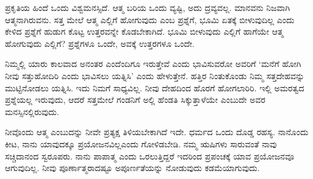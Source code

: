 ಪ್ರಕೃತಿಯ ಹಿಂದೆ ಒಂದು ವಿಶ್ವಮನಸ್ಸಿದೆ. ಆತ್ಮ ಬರಿಯ ಒಂದು ವ್ಯಷ್ಟಿ, ಅದು ದ್ರವ್ಯವಲ್ಲ. ಮಾನವನು ನಿಜವಾಗಿ ಆತ್ಮನಾಗಿರುವನು. ಸತ್ತ ಮೇಲೆ ಆತ್ಮ ಎಲ್ಲಿಗೆ ಹೋಗುವುದು ಎಂಬ ಪ್ರಶ್ನೆಗೆ, ಭೂಮಿ ಏತಕ್ಕೆ ಬೀಳುವುದಿಲ್ಲ ಎಂದು ಕೇಳಿದ ಪ್ರಶ್ನೆಗೆ ಹುಡುಗ ಕೊಟ್ಟ ಉತ್ತರವನ್ನೇ ಕೊಡಬೇಕಾಗಿದೆ. ಭೂಮಿ ಬೀಳುವುದು ಎಲ್ಲಿಗೆ ಹಾಗೆಯೇ ಆತ್ಮ ಹೋಗುವುದು ಎಲ್ಲಿಗೆ? ಪ್ರಶ್ನೆಗಳೂ ಒಂದೇ, ಅವಕ್ಕೆ ಉತ್ತರಗಳೂ ಒಂದೇ.

ನಿಮ್ಮಲ್ಲಿ ಯಾರು ಕಾಲವಾದ ಅನಂತರ ಎಂದೆಂದಿಗೂ ಇರುತ್ತೇವೆ ಎಂದು ಭಾವಿಸುವರೋ ಅವರಿಗೆ ‘ಮನೆಗೆ ಹೋಗಿ ನೀವು ಸತ್ತುಹೋದಿರಿ ಎಂದು ಭಾವಿಸಲು ಯತ್ನಿಸಿ’ ಎಂದು ಹೇಳುತ್ತೇನೆ. ಹತ್ತಿರ ನಿಂತುಕೊಂಡು ನಿಮ್ಮ ಸತ್ತದೇಹವನ್ನು ಮುಟ್ಟಿನೋಡಲು ಯತ್ನಿಸಿ. ಇದು ನಿಮಗೆ ಸಾಧ್ಯವಿಲ್ಲ. ನೀವು ದೇಹದಿಂದ ಹೊರಗೆ ಹೋಗಲಾರಿರಿ. ಇಲ್ಲಿ ಅಮರತ್ವದ ಪ್ರಶ್ನೆಯಲ್ಲ ಇರುವುದು, ಆದರೆ ಸತ್ತಮೇಲೆ ಗಂಡನಿಗೆ ಅಲ್ಲಿ ಹೆಂಡತಿ ಸಿಕ್ಕುತ್ತಾಳೆಯೇ ಎಂಬುದೇ ಅವರ ಮನಸ್ಸಿನಲ್ಲಿರುವುದು.

\eject

ನೀವೊಂದು ಆತ್ಮ ಎಂಬುದನ್ನು ನೀವೇ ಪ್ರತ್ಯಕ್ಷ ತಿಳಿಯಬೇಕಾಗಿದೆ ಇದೇ. ಧರ್ಮದ ಒಂದು ದೊಡ್ಡ ರಹಸ್ಯ. ನಾನೊಂದು ಕೀಟ, ನಾನು ಯಾವುದಕ್ಕೂ ಪ್ರಯೋಜನವಿಲ್ಲ\break ಎಂದು ಗೋಳಿಡಬೇಡಿ. ನಮ್ಮ ಋಷಿಗಳು ಸಾರುವಂತೆ ನಾವು ಸಚ್ಚಿದಾನಂದ ಸ್ವರೂಪರು. ನಾನು ಪಾಪಾತ್ಮ ಎಂದು ಒರಲುತ್ತಿದ್ದರೆ ಇದರಿಂದ ಪ್ರಪಂಚಕ್ಕೆ ಯಾವ ಪ್ರಯೋಜನವೂ ಆಗುವುದಿಲ್ಲ. ನೀವು ಪೂರ್ಣಾತ್ಮರಾದಷ್ಟೂ ಅಪೂರ್ಣತೆಯನ್ನು ನೋಡುವುದು ಕಡಮೆಯಾಗುವುದು.

